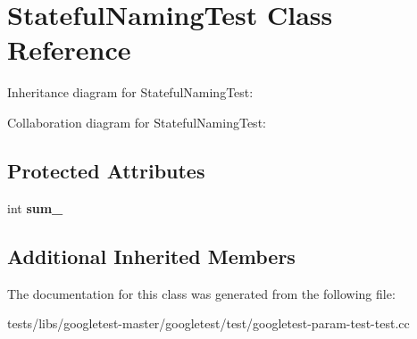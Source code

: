 \hypertarget{classStatefulNamingTest}{}\section{Stateful\+Naming\+Test Class Reference}
\label{classStatefulNamingTest}


Inheritance diagram for Stateful\+Naming\+Test\+:


Collaboration diagram for Stateful\+Naming\+Test\+:
\subsection*{Protected Attributes}
\begin{DoxyCompactItemize}
\item 
\mbox{\label{classStatefulNamingTest_ad719a1c2919c304bfe840313142a376a}} 
int {\bfseries sum\+\_\+}
\end{DoxyCompactItemize}
\subsection*{Additional Inherited Members}


The documentation for this class was generated from the following file\+:\begin{DoxyCompactItemize}
\item 
tests/libs/googletest-\/master/googletest/test/googletest-\/param-\/test-\/test.\+cc\end{DoxyCompactItemize}
